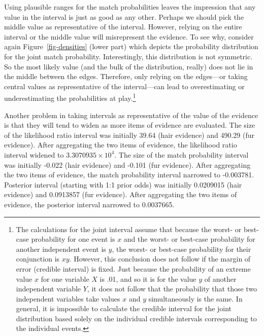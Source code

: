 \documentclass[
  letterpaper,
  DIV=11,
  numbers=noendperiod]{scrartcl}
\begin{document}
Using plausible ranges for the match probabilities leaves the impression
that any value in the interval is just as good as any other. Perhaps we
should pick the middle value as representative of the interval. However,
relying on the entire interval or the middle value will misrepresent the
evidence. To see why, consider again Figure~\ref{fig-densities} (lower
part) which depicts the probability distribution for the joint match
probability. Interestingly, this distribution is not symmetric. So the
most likely value (and the bulk of the distribution, really) does not
lie in the middle between the edges. Therefore, only relying on the
edges---or taking central values as representative of the interval---can
lead to overestimating or underestimating the probabilities at
play.\footnote{The calculations for the joint interval assume that because the worst- or best-case probability for one event is $x$ and the worst- or best-case probability for another independent event is $y$, the worst- or best-case probability for their conjunction is  $xy$. However, this conclusion does not follow if the margin of error (credible interval) is fixed. Just because the probability of an extreme value $x$ for one variable $X$ is .01, and so it is for the value $y$ of another independent variable $Y$, it does not follow that the probability that those two independent variables take values $x$ and $y$ simultaneously is the same. In general, it is impossible to calculate the credible interval for the joint distribution based solely on the individual credible intervals corresponding to the individual events.}

Another problem in taking intervals as representative of the value of
the evidence is that they will tend to widen as more items of evidence
are evaluated. The size of the likelihood ratio interval was initially
39.64 (hair evidence) and 490.29 (fur evidence). After aggregating the
two items of evidence, the likelihood ratio interval widened to
\ensuremath{3.3070935\times 10^{4}}. The size of the match probability
interval was initially -0.022 (hair evidence) and -0.101 (fur evidence).
After aggregating the two items of evidence, the match probability
interval narrowed to -0.003781. Posterior interval (starting with 1:1
prior odds) was initially 0.0209015 (hair evidence) and 0.0913857 (fur
evidence). After aggregating the two items of evidence, the posterior
interval narrowed to 0.0037665.

\end{document}
